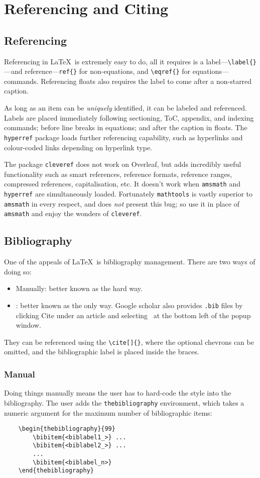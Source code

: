 \chapter{Referencing and Citing}
\section{Referencing}
%
Referencing in \LaTeX~is extremely easy to do, all it requires is a
label---\verb|\label{}|---and reference---\verb|ref{}| for
non-equations, and \verb|\eqref{}| for equations---commands.
Referencing floats also requires the label to come after a non-starred
caption.

As long as an item can be \emph{uniquely} identified, it can be
labeled and referenced.  Labels are placed immediately following
sectioning, ToC, appendix, and indexing commands; before line breaks
in equations; and after the caption in floats.  The \verb|hyperref|
package loads further referencing capability, such as hyperlinks and
colour-coded links depending on hyperlink type.

The package \verb|cleveref| does not work on Overleaf, but adds
incredibly useful functionality such as smart references, reference
formats, reference ranges, compressed references, capitalisation, etc.
It doesn't work when \verb|amsmath| and \verb|hyperref| are
simultaneously loaded.  Fortunately \verb|mathtools| is vastly
superior to \verb|amsmath| in every respect, and does \emph{not}
present this bug; so use it in place of \verb|amsmath| and enjoy the
wonders of \verb|cleveref|.
%
\section{Bibliography}
%
One of the appeals of \LaTeX~is bibliography management.  There are
two ways of doing so:
\begin{itemize}
    \item Manually: better known as the hard way.
    \item \BibTeX: better known as the only way.  Google scholar also
      provides \texttt{.bib} files by clicking Cite under an article
      and selecting \BibTeX~at the bottom left of the popup window.
\end{itemize}
They can be referenced using the \verb|\cite[]{}|, where the optional
chevrons can be omitted, and the bibliographic label is placed inside
the braces.
%
\subsection{Manual}
%
Doing things manually means the user has to hard-code the style into
the bibliography.  The user adds the \verb|thebibliography|
environment, which takes a numeric argument for the maximum number of
bibliographic items:
\begin{verbatim}
	\begin{thebibliography}{99}
	    \bibitem{<biblabel1_>} ...
	    \bibitem{<biblabel2_>} ...
	    ...
	    \bibitem{<biblabel_n>}
	\end{thebibliography}
\end{verbatim}
%
